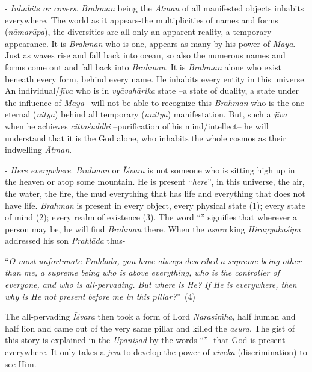 - \emph{Inhabits or covers}. \emph{Brahman} being the \emph{Ātman} of all manifested objects inhabits everywhere. The world as it appears-the multiplicities of names and forms (\emph{nāmarūpa}), the diversities are all only an apparent reality, a temporary appearance. It is \emph{Brahman} who is one, appears as many by his power of \emph{Māyā}. Just as waves rise and fall back into ocean, so also the numerous names and forms come out and fall back into \emph{Brahman}. It is \emph{Brahman} alone who exist beneath every form, behind every name. He inhabits every entity in this universe. An individual/\emph{jīva} who is in \emph{vyāvahārika} state --a state of duality, a state under the influence of \emph{Māyā}-- will not be able to recognize this \emph{Brahman} who is the one eternal (\emph{nitya}) behind all temporary (\emph{anitya}) manifestation. But, such a \emph{jīva} when he achieves \emph{cittaśuddhi} --purification of his mind/intellect-- he will understand that it is the God alone, who inhabits the whole cosmos as their indwelling \emph{Ātman}.

 - \emph{Here everywhere}. \emph{Brahman} or \emph{Īśvara} is not someone who is sitting high up in the heaven or atop some mountain. He is present ``\emph{here}'', in this universe, the air, the water, the fire, the mud everything that has life and everything that does not have life. \emph{Brahman} is present in every object, every physical state (1); every state of mind (2); every realm of existence (3). The word ``'' signifies that wherever a person may be, he will find \emph{Brahman} there. When the \emph{asura} king \emph{Hiraṇyakaśipu} addressed his son \emph{Prahlāda} thus-

``\emph{O most unfortunate Prahlāda, you have always described a supreme being other than me, a supreme being who is above everything, who is the controller of everyone, and who is all-pervading. But where is He? If He is everywhere, then why is He not present before me in this pillar?}''~(4)

The all-pervading \emph{Īśvara} then took a form of Lord \emph{Narasiṁha}, half human and half lion and came out of the very same pillar and killed the \emph{asura}. The gist of this story is explained in the \emph{Upaniṣad} by the words ``''- that God is present everywhere. It only takes a \emph{jīva} to develop the power of \emph{viveka} (discrimination) to see Him.
\vskip 1.1pt

